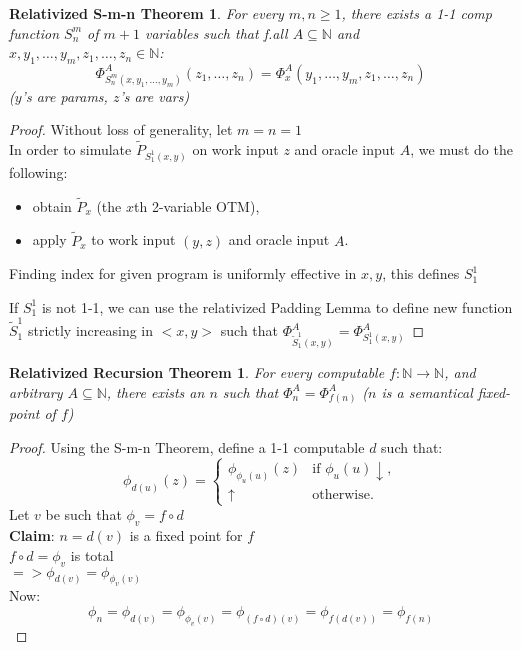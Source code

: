 \documentclass[12pt]{article}
\newcommand{\Nat}{\ensuremath{\mathbb{N}}}
\begin{document}
\newtheorem*{relsmn}{Relativized S-m-n Theorem}
\begin{relsmn}
For every $m,n \ge 1$, there exists a 1-1 comp function $S_n^m$ of $m+1$ variables such that f.all $A\subseteq \Nat$ and $x,y_1,\ldots,y_m, z_1, \ldots, z_n \in \Nat$:
\[\Phi^A_{S_n^m(x,y_1,\ldots,y_m)}(z_1, \ldots, z_n)
= \Phi^A_{x}(y_1,\ldots,y_m,z_1,\ldots,z_n)\]
		($y$'s are params, $z$'s are vars)
\end{relsmn}
%
\begin{proof}
Without loss of generality, let $m=n=1$ \\
In order to simulate $\tilde{P}_{S_1^1(x,y)}$
on work input $z$ and oracle input $A$, we must do the following:
\begin{itemize}
  \item
    obtain $\tilde{P}_x$ (the $x$th 2-variable OTM),
  \item
    apply $\tilde{P}_x$ to work input $(y,z)$ and oracle input $A$.
\end{itemize}
Finding index for given program is uniformly effective in $x,y$, this defines $S_1^1$

If $S_1^1$ is not 1-1, we can use the relativized Padding Lemma to define new function $\tilde{S}_1^1$ strictly increasing in $<x,y>$
such that $\Phi^A_{\tilde{S}_1^1(x,y)} = \Phi^A_{S_1^1(x,y)}$
\end{proof}


\newtheorem*{relrec}{Relativized Recursion Theorem}
\begin{relrec}
For every computable $f: \Nat \rightarrow \Nat$, 
and arbitrary $A \subseteq \Nat$,
there exists an $n$ such that $\Phi^A_n = \Phi^A_{f(n)}$
	($n$ is a semantical fixed-point of $f$)
\end{relrec}
%
\begin{proof}
Using the S-m-n Theorem, define a 1-1 computable $d$ such that:
\[
\phi_{d(u)}(z) = \begin{cases}
  \phi_{\phi_u(u)}(z)		&\text{if } \phi_u(u) \downarrow, \\
  \uparrow			&\text{otherwise.}
\end{cases}
\]
Let $v$ be such that $\phi_v = f \circ d$ \\
{\bf Claim}:  
$n= d(v)$ is a fixed point for $f$ \\
	$f \circ d = \phi_v$ is total \\
	$=> \phi_{d(v)} = \phi_{\phi_v(v)}$ \\
Now: \[
\phi_n = \phi_{d(v)} = \phi_{\phi_v(v)} = \phi_{(f \circ d)(v)} = \phi_{f(d(v))} = \phi_{f(n)} 
\]
\end{proof}
\end{document}
